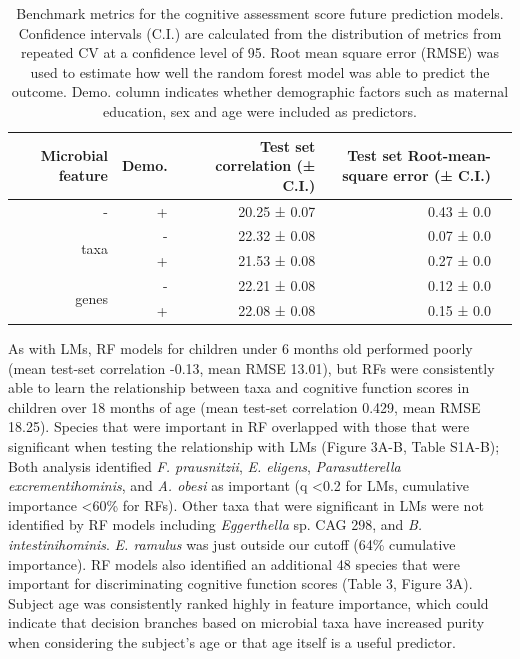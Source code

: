 \documentclass{article}
\begin{document}
\begin{table}[!h]
    \begin{center}
    \begin{tabular}{|r|r|r|r|r}
        \hline
        \textbf{Microbial feature} & \textbf{Demo.} & \textbf{Test set correlation (± C.I.)} & \textbf{Test set Root-mean-square error (± C.I.)} \\\hline
        - & + & 20.25 ± 0.07 & 0.43 ± 0.0 \\ \cline{1-4}
        \multirow{2}{*}{taxa} & - & 22.32 ± 0.08 & 0.07 ± 0.0 \\ \cline{2-4}
            & + & 21.53 ± 0.08 & 0.27 ± 0.0 \\ \cline{1-4}
        \multirow{2}{*}{genes} & - & 22.21 ± 0.08 & 0.12 ± 0.0 \\ \cline{2-4}
            & + & 22.08 ± 0.08 & 0.15 ± 0.0 \\\hline\hline
    \end{tabular}
    \caption{\label{tab:rfbench2}Benchmark metrics for the cognitive assessment score
    future prediction models. Confidence intervals (C.I.) are calculated from the
    distribution of metrics from repeated CV at a confidence level of 95.
    Root mean square error (RMSE) was used to estimate how well the random forest model was able to predict the outcome.
    Demo. column indicates whether demographic factors such as maternal education, sex and age were included as predictors.}
    \end{center}
\end{table}

As with LMs, RF models for children under 6 months old
performed poorly (mean test-set correlation -0.13, mean RMSE 13.01),
but RFs were consistently able to learn the relationship between taxa
and cognitive function scores in children over 18 months of age (mean
test-set correlation 0.429, mean RMSE 18.25).
Species that were important in RF overlapped with those that were
significant when testing the relationship with LMs (Figure
3A-B, Table S1A-B); Both analysis identified 
\textit{F. prausnitzii}, %
\textit{E. eligens}, %
\textit{Parasutterella excrementihominis}, and %
\textit{A. obesi} as important %
(q \textless 0.2 for LMs, cumulative importance \textless 60\% for RFs).
Other taxa that were significant in LMs were not identified by RF models
including \textit{Eggerthella} sp. CAG 298,
and \textit{B. intestinihominis}. \textit{E. ramulus}
was just outside our cutoff (64\% cumulative importance). %
RF models also identified an additional 48 species
that were important for discriminating cognitive function scores
(Table 3, Figure 3A). Subject age was consistently ranked highly in
feature importance, which could indicate that decision branches based on
microbial taxa have increased purity when considering the subject's age
or that age itself is a useful predictor.
\end{document}
